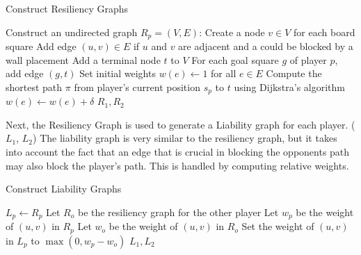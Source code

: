 \documentclass[10pt]{article}
\begin{document}
\begin{algorithm}
\caption{Construct Resiliency Graphs}
\begin{algorithmic}[1]
    \State Construct an undirected graph $R_p = (V, E)$:
    \State \hspace{1em} Create a node $v \in V$ for each board square
    \State \hspace{1em} Add edge $(u, v) \in E$ if $u$ and $v$ are adjacent and a could be blocked by a wall placement
    \State \hspace{1em} Add a terminal node $t$ to $V$
    \State \hspace{1em} For each goal square $g$ of player $p$, add edge $(g, t)$
    \State \hspace{1em} Set initial weights $w(e) \gets 1$ for all $e \in E$
        \State Compute the shortest path $\pi$ from player’s current position $s_p$ to $t$ using Dijkstra's algorithm
            \State $w(e) \gets w(e) + \delta$
        \EndFor
    \EndFor
\EndFor
\State \Return $R_1, R_2$
\end{algorithmic}
\end{algorithm}

Next, the Resiliency Graph is used to generate a Liability graph for each player. ($L_1$, $L_2$) The liability graph is very similar to the resiliency graph, but it takes into account the fact that an edge that is crucial in blocking the opponents path may also block the player's path. This is handled by computing relative weights.  

\begin{algorithm}
\caption{Construct Liability Graphs}
\begin{algorithmic}[1]
    \State $L_p \gets R_p$
    \State Let $R_o$ be the resiliency graph for the other player
        \State Let $w_p$ be the weight of $(u, v)$ in $R_p$
        \State Let $w_o$ be the weight of $(u, v)$ in $R_o$
        \State Set the weight of $(u, v)$ in $L_p$ to $\max(0, w_p - w_o)$
    \EndFor
\EndFor
\State \Return $L_1, L_2$
\end{algorithmic}
\end{algorithm}
\end{document}
